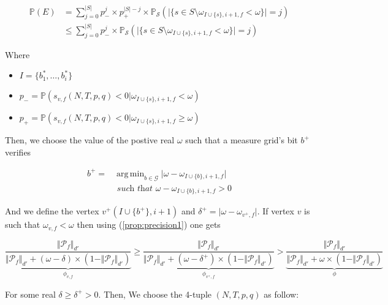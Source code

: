 \documentclass[a4paper, 11pt]{article}
\DeclareMathOperator*{\argmin}{arg\,min}
\begin{document}
\begin{align*}
\mathbb{P} \left( E \right)&= \sum_{j=0}^{\vert S \vert} p_{-}^j \times p_{+}^{\vert S \vert -j} \times\mathbb{P}_{\mathcal{S}} \left( \vert \lbrace s \in S \setminus \omega_{I \cup \{s\}, i + 1, f } < \omega \rbrace \vert = j \right) \\
&\leq \sum_{j=0}^{\vert S \vert} p_{-}^j \times \mathbb{P}_{\mathcal{S}} \left( \vert \lbrace s \in S \setminus \omega_{I \cup \{s\}, i + 1, f } < \omega \rbrace \vert = j \right)
\end{align*}  

Where 
\begin{itemize}
\item $I =\{b_{1}^{*}, \ldots, b_{i}^{*}\}$
\item $p_{-} = \mathbb{P} \left( s_{v, f}(N, T, p, q) < 0 \vert \omega_{I\cup\{s \}, i + 1, f} < \omega \right)$
\item $p_{+} = \mathbb{P} \left( s_{v, f}(N, T, p, q) < 0 \vert \omega_{I\cup\{s \}, i + 1, f} \geq \omega \right)$
\end{itemize}

Then, we choose the value of the postive real $\omega$ such that a measure grid's bit $b^{+}$ verifies

\begin{align*}
b^{+} = &\argmin_{b \in \mathcal{G}} \vert \omega - \omega_{I \cup \{ b \}, i +1, f} \vert \\
&\textit{ such that } \omega - \omega_{I \cup \{ b \}, i +1, f} > 0 
\end{align*}

And we define the vertex $v^{+}(I \cup \{b^{+}\}, i+1)$ and $\delta^{+} = \vert \omega - \omega_{v^{+}, f} \vert$. If vertex $v$ is such that $\omega_{v,f}  < \omega$ then using (\ref{prop:precision1}) one gets

\begin{equation*}
\underbrace{\frac{\Vert \mathcal{P}_{f} \Vert_{d'}}{\Vert \mathcal{P}_{f} \Vert_{d'} + (\omega - \delta) \times (1 - \Vert \mathcal{P}_{f} \Vert_{d'})}}_{\phi_{v, f}} \geq \underbrace{\frac{\Vert \mathcal{P}_{f} \Vert_{d'}}{\Vert \mathcal{P}_{f} \Vert_{d'} + (\omega - \delta^{+}) \times (1 - \Vert \mathcal{P}_{f} \Vert_{d'})}}_{\phi_{v^{+}, f}} > \underbrace{\frac{\Vert \mathcal{P}_{f} \Vert_{d'}}{\Vert \mathcal{P}_{f} \Vert_{d'} + \omega  \times (1 - \Vert \mathcal{P}_{f} \Vert_{d'})}}_{\phi}
\end{equation*}

For some real $\delta \geq \delta^{+} > 0$. Then, We choose the 4-tuple $(N, T, p, q)$ as follow:
\end{document}

